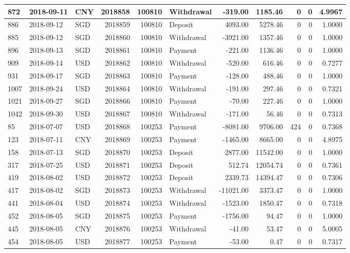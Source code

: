 \documentclass[]{article}
\begin{document}
\begin{table}[H]
\begin{tabular}{l|l|l|r|r|l|r|r|r|r|r}
\hline
872 & 2018-09-11 & CNY & 2018858 & 100810 & Withdrawal & -319.00 & 1185.46 & 0 & 0 & 4.9967\\
\hline
886 & 2018-09-12 & SGD & 2018859 & 100810 & Deposit & 4093.00 & 5278.46 & 0 & 0 & 1.0000\\
\hline
885 & 2018-09-12 & SGD & 2018860 & 100810 & Withdrawal & -3921.00 & 1357.46 & 0 & 0 & 1.0000\\
\hline
896 & 2018-09-13 & SGD & 2018861 & 100810 & Payment & -221.00 & 1136.46 & 0 & 0 & 1.0000\\
\hline
909 & 2018-09-14 & USD & 2018862 & 100810 & Withdrawal & -520.00 & 616.46 & 0 & 0 & 0.7277\\
\hline
931 & 2018-09-17 & SGD & 2018863 & 100810 & Payment & -128.00 & 488.46 & 0 & 0 & 1.0000\\
\hline
1007 & 2018-09-24 & USD & 2018864 & 100810 & Withdrawal & -191.00 & 297.46 & 0 & 0 & 0.7321\\
\hline
1021 & 2018-09-27 & SGD & 2018866 & 100810 & Payment & -70.00 & 227.46 & 0 & 0 & 1.0000\\
\hline
1042 & 2018-09-30 & USD & 2018867 & 100810 & Withdrawal & -171.00 & 56.46 & 0 & 0 & 0.7313\\
\hline
85 & 2018-07-07 & USD & 2018868 & 100253 & Payment & -8081.00 & 9706.00 & 424 & 0 & 0.7368\\
\hline
123 & 2018-07-11 & CNY & 2018869 & 100253 & Payment & -1465.00 & 8665.00 & 0 & 0 & 4.8975\\
\hline
158 & 2018-07-13 & SGD & 2018870 & 100253 & Deposit & 2877.00 & 11542.00 & 0 & 0 & 1.0000\\
\hline
317 & 2018-07-25 & USD & 2018871 & 100253 & Deposit & 512.74 & 12054.74 & 0 & 0 & 0.7361\\
\hline
419 & 2018-08-02 & USD & 2018872 & 100253 & Deposit & 2339.73 & 14394.47 & 0 & 0 & 0.7306\\
\hline
417 & 2018-08-02 & SGD & 2018873 & 100253 & Withdrawal & -11021.00 & 3373.47 & 0 & 0 & 1.0000\\
\hline
441 & 2018-08-04 & USD & 2018874 & 100253 & Withdrawal & -1523.00 & 1850.47 & 0 & 0 & 0.7318\\
\hline
452 & 2018-08-05 & SGD & 2018875 & 100253 & Payment & -1756.00 & 94.47 & 0 & 0 & 1.0000\\
\hline
445 & 2018-08-05 & CNY & 2018876 & 100253 & Withdrawal & -41.00 & 53.47 & 0 & 0 & 5.0005\\
\hline
454 & 2018-08-05 & USD & 2018877 & 100253 & Payment & -53.00 & 0.47 & 0 & 0 & 0.7317\\

\end{tabular}
\end{table}
\end{document}
